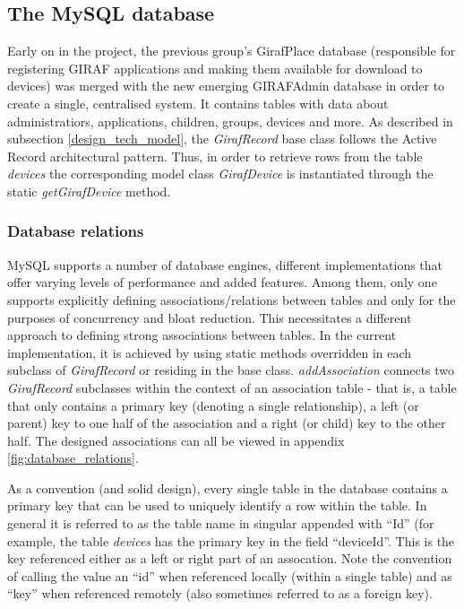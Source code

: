 \subsection{The MySQL database}
Early on in the project, the previous group's GirafPlace database (responsible for registering GIRAF applications and making them available for download to devices) was merged with the new emerging GIRAFAdmin database in order to create a single, centralised system. It contains tables with data about administratiors, applications, children, groups, devices and more.
As described in subsection \vref{design_tech_model}, the \emph{GirafRecord} base class follows the Active Record architectural pattern. Thus, in order to retrieve rows from the table \emph{devices} the corresponding model class \emph{GirafDevice} is instantiated through the static \emph{getGirafDevice} method.

\subsubsection{Database relations}
MySQL supports a number of database engines, different implementations that offer varying levels of performance and added features. Among them, only one supports explicitly defining associations/relations between tables and only for the purposes of concurrency and bloat reduction. This necessitates a different approach to defining strong associations between tables. In the current implementation, it is achieved by using static methods overridden in each subclass of \emph{GirafRecord} or residing in the base class.
\emph{addAssociation} connects two \emph{GirafRecord} subclasses within the context of an association table - that is, a table that only contains a primary key (denoting a single relationship), a left (or parent) key to one half of the association and a right (or child) key to the other half. The designed associations can all be viewed in appendix \vref{fig:database_relations}.

As a convention (and solid design), every single table in the database contains a primary key that can be used to uniquely identify a row within the table. In general it is referred to as the table name in singular appended with ``Id'' (for example, the table \emph{devices} has the primary key in the field ``deviceId''. This is the key referenced either as a left or right part of an assocation. Note the convention of calling the value an ``id'' when referenced locally (within a single table) and as ``key'' when referenced remotely (also sometimes referred to as a foreign key).

